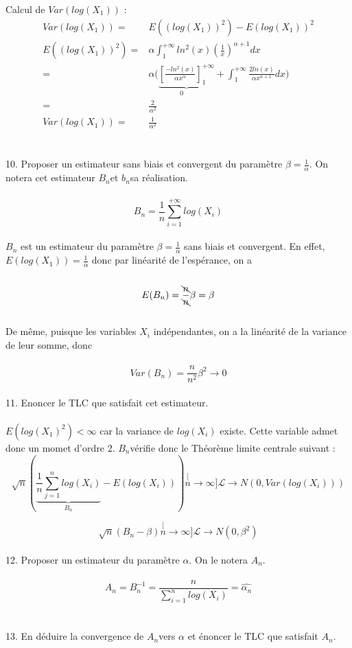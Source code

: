 \documentclass{article}
\begin{document}
Calcul de $Var(log(X_{1}))$ :
\begin{align*}
Var(log(X_{1}))= & E((log(X_{1}))^{2})-E(log(X_{1}))^{2}\\
E((log(X_{1}))^{2})= & \alpha\int_{1}^{+\infty}ln^{2}(x)(\frac{1}{x})^{\alpha+1}dx\\
= & \underset{0}{\alpha(\underbrace{[\frac{-ln^{2}(x)}{\alpha x^{\alpha}}]_{1}^{+\infty}}}+\int_{1}^{+\infty}\frac{2ln(x)}{\alpha x^{\alpha+1}}dx)\\
= & \frac{2}{\alpha^{2}}\\
Var(log(X_{1}))= & \frac{1}{\alpha^{2}}
\end{align*}
\\
\\
10. Proposer un estimateur sans biais et convergent du paramètre $\beta=\frac{1}{\alpha}$.
On notera cet estimateur $B_{n}$et $b_{n}$sa réalisation.\\
\\
\[
B_{n}=\frac{1}{n}\sum_{i=1}^{+\infty}log(X_{i})
\]
\\
$B_{n}$ est un estimateur du paramètre $\beta=\frac{1}{\alpha}$
sans biais et convergent. En effet, $E(log(X_{1}))=\frac{1}{\alpha}$
donc par linéarité de l'espérance, on a\\
\\
\[
E(B_{n})=\frac{\bcancel{n}}{\bcancel{n}}\beta=\beta
\]
\\
De même, puisque les variables $X_{i}$ indépendantes, on a la linéarité
de la variance de leur somme, donc\\
\\
\[
Var(B_{n})=\frac{n}{n^{2}}\beta^{2}\rightarrow0
\]
\\
11. Enoncer le TLC que satisfait cet estimateur.\\
\\
$E(log(X_{1})^{2})<\infty$ car la variance de $log(X_{i})$ existe.
Cette variable admet donc un momet d'ordre 2. $B_{n}$vérifie donc
le Théorème limite centrale suivant :\\
\[
\sqrt{n}(\underset{B_{n}}{\underbrace{\frac{1}{n}\sum_{j=1}^{n}log(X_{i})}}-E(log(X_{i})))\stackrel[n\rightarrow\infty]{\mathcal{L}}{\rightarrow}N(0,Var(log(X_{i})))
\]

\[
\sqrt{n}(B_{n}-\beta)\stackrel[n\rightarrow\infty]{\mathcal{L}}{\rightarrow}N(0,\beta^{2})
\]
\\
12. Proposer un estimateur du paramètre $\alpha$. On le notera $A_{n}$.\\
\\
\[
A_{n}=B_{n}^{-1}=\frac{n}{\sum_{i=1}^{n}log(X_{i})}=\widehat{\alpha_{n}}
\]
\\
\\
13. En déduire la convergence de $A_{n}$vers $\alpha$ et énoncer
le TLC que satisfait $A_{n}.$
\end{document}

